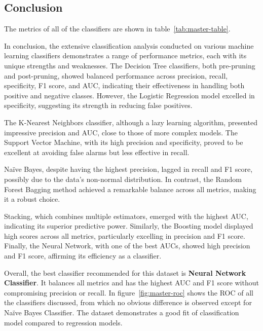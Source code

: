 \subsection{Conclusion}

The metrics of all of the classifiers are shown in table~\ref{tab:master-table}. \

In conclusion, the extensive classification analysis conducted on various machine learning classifiers demonstrates a range of performance metrics, each with its unique strengths and weaknesses. The Decision Tree classifiers, both pre-pruning and post-pruning, showed balanced performance across precision, recall, specificity, F1 score, and AUC, indicating their effectiveness in handling both positive and negative classes. However, the Logistic Regression model excelled in specificity, suggesting its strength in reducing false positives.

The K-Nearest Neighbors classifier, although a lazy learning algorithm, presented impressive precision and AUC, close to those of more complex models. The Support Vector Machine, with its high precision and specificity, proved to be excellent at avoiding false alarms but less effective in recall.

Naïve Bayes, despite having the highest precision, lagged in recall and F1 score, possibly due to the data's non-normal distribution. In contrast, the Random Forest Bagging method achieved a remarkable balance across all metrics, making it a robust choice.

Stacking, which combines multiple estimators, emerged with the highest AUC, indicating its superior predictive power. Similarly, the Boosting model displayed high scores across all metrics, particularly excelling in precision and F1 score. Finally, the Neural Network, with one of the best AUCs, showed high precision and F1 score, affirming its efficiency as a classifier.

Overall, the best classifier recommended for this dataset is \textbf{Neural Network Classifier}. It balances all metrics and has the highest AUC and F1 score without compromising precision or recall. In figure~\ref{fig:master-roc} shows the ROC of all the classifiers discussed, from which no obvious difference is observed except for Na\"ive Bayes Classifier. The dataset demonstrates a good fit of classification model compared to regression models.

